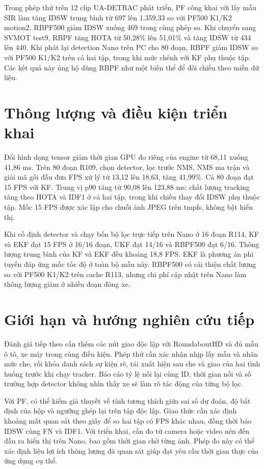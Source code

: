 Trong phép thử trên 12 clip UA-DETRAC phát triển, PF công khai với lấy mẫu SIR làm tăng IDSW trung bình từ 697 lên 1.359,33 so với PF500 K1/K2 motion2. RBPF500 giảm IDSW xuống 469 trong cùng phép so. Khi chuyển sang SVMOT test9, RBPF tăng HOTA từ 50,28\% lên 51,01\% và tăng IDSW từ 434 lên 440. Khi phát lại detection Nano trên PC cho 80 đoạn, RBPF giảm IDSW so với PF500 K1/K2 trên cả hai tập, trong khi mức chênh với KF phụ thuộc tập. Các kết quả này ủng hộ dùng RBPF như một biến thể để đối chiếu theo miền dữ liệu.

\section{Thông lượng và điều kiện triển khai}
Đổi hình dạng tensor giảm thời gian GPU đo riêng của engine từ 68,11 xuống 41,86 ms. Trên 80 đoạn R109, chọn detector, lọc trước NMS, NMS ma trận và giải mã gối đầu đưa FPS xử lý từ 13,12 lên 18,63, tăng 41,99\%. Cả 80 đoạn đạt 15 FPS với KF. Trung vị p90 tăng từ 90,08 lên 123,88 ms; chất lượng tracking tăng theo HOTA và IDF1 ở cả hai tập, trong khi chiều thay đổi IDSW phụ thuộc tập. Mốc 15 FPS được xác lập cho chuỗi ảnh JPEG trên tmpfs, không bật hiển thị.

Khi cố định detector và chạy bốn bộ lọc trực tiếp trên Nano ở 16 đoạn R114, KF và EKF đạt 15 FPS ở 16/16 đoạn, UKF đạt 14/16 và RBPF500 đạt 6/16. Thông lượng trung bình của KF và EKF đều khoảng 18,8 FPS. EKF là phương án phi tuyến đáp ứng mốc tốc độ ở toàn bộ mẫu này. RBPF500 có cải thiện chất lượng so với PF500 K1/K2 trên cache R113, nhưng chi phí cập nhật trên Nano làm thông lượng giảm ở nhiều đoạn đông xe.

\section{Giới hạn và hướng nghiên cứu tiếp}
Đánh giá tiếp theo cần thêm các nút giao độc lập với RoundaboutHD và đủ mẫu ô tô, xe máy trong cùng điều kiện. Phép thử cần xác nhận nhịp lấy mẫu và nhãn mức che, rồi khóa danh sách sự kiện rẽ, tái xuất hiện sau che và giao của hai tình huống trước khi chạy tracker. Báo cáo tỷ lệ nối lại cùng ID, thời gian nối và số trường hợp detector không nhìn thấy xe sẽ làm rõ tác động của từng bộ lọc.

Với PF, có thể kiểm giả thuyết về tính tương thích giữa sai số dự đoán, độ bất định của hộp và ngưỡng ghép lại trên tập độc lập. Giao thức cần xác định khoảng mất quan sát theo giây để so hai tập có FPS khác nhau, đồng thời báo IDSW cùng FN và IDF1. Với triển khai, cần đo từ camera hoặc video nén đến đầu ra hiển thị trên Nano, bao gồm thời gian chờ từng ảnh. Phép đo này có thể xác định liệu lợi ích thông lượng đã quan sát giúp đạt yêu cầu thời gian thực của ứng dụng cụ thể.
